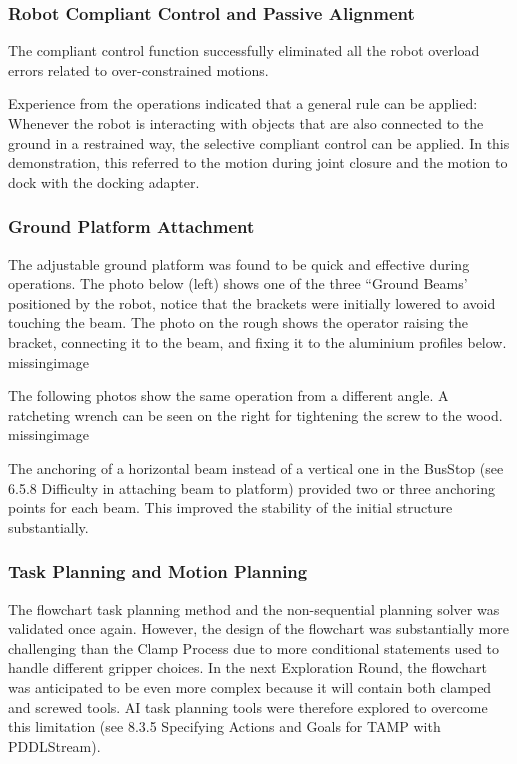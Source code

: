 \subsubsection{Robot Compliant Control and Passive Alignment}
\label{subsubsection:exploration-4-robot-compliant-control-and-passive-alignment}

The compliant control function  successfully eliminated all the robot overload errors related to over-constrained motions. 

Experience from the operations indicated that a general rule can be applied: Whenever the robot is interacting with objects that are also connected to the ground in a restrained way, the selective compliant control can be applied. In this demonstration, this referred to the motion during joint closure and the motion to dock with the docking adapter.

\subsubsection{Ground Platform Attachment}
\label{subsubsection:exploration-4-ground-platform-attachment}

The adjustable ground platform  was found to be quick and effective during operations. The photo below (left) shows one of the three “Ground Beams' positioned by the robot, notice that the brackets were initially lowered to avoid touching the beam. The photo on the rough shows the operator raising the bracket, connecting it to the beam, and fixing it to the aluminium profiles below.
missingimage

The following photos show the same operation from a different angle. A ratcheting wrench can be seen on the right for tightening the screw to the wood.
missingimage

The anchoring of a horizontal beam instead of a vertical one in the BusStop (see 6.5.8 Difficulty in attaching beam to platform) provided two or three anchoring points for each beam. This improved the stability of the initial structure substantially.

\subsubsection{Task Planning and Motion Planning}
\label{subsubsection:exploration-4-task-planning-and-motion-planning}

The flowchart task planning method  and the non-sequential planning solver  was validated once again. However, the design of the flowchart  was substantially more challenging than the Clamp Process due to more conditional statements used to handle different gripper choices. 
In the next Exploration Round, the flowchart was anticipated to be even more complex because it will contain both clamped and screwed tools. AI task planning tools were therefore explored to overcome this limitation (see 8.3.5 Specifying Actions and Goals for TAMP with PDDLStream). 

